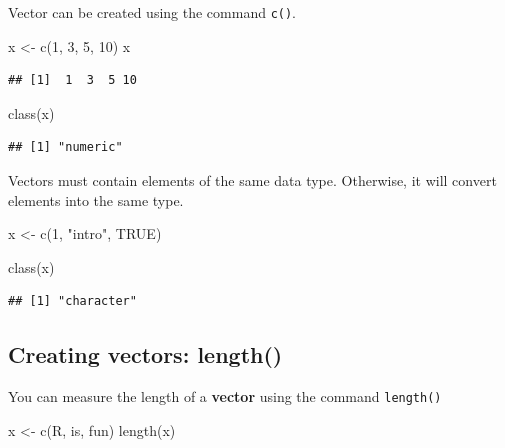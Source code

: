 \documentclass[
  11pt,
]{book}
\newenvironment{Shaded}{\begin{snugshade}}{\end{snugshade}}
\newcommand{\ConstantTok}[1]{\textcolor[rgb]{0.00,0.00,0.00}{#1}}
\newcommand{\DecValTok}[1]{\textcolor[rgb]{0.00,0.00,0.81}{#1}}
\newcommand{\FunctionTok}[1]{\textcolor[rgb]{0.00,0.00,0.00}{#1}}
\newcommand{\NormalTok}[1]{#1}
\newcommand{\OtherTok}[1]{\textcolor[rgb]{0.56,0.35,0.01}{#1}}
\newcommand{\StringTok}[1]{\textcolor[rgb]{0.31,0.60,0.02}{#1}}
\begin{document}
Vector can be created using the command \texttt{c()}.

\begin{Shaded}
\begin{Highlighting}[]
\NormalTok{x }\OtherTok{\textless{}{-}} \FunctionTok{c}\NormalTok{(}\DecValTok{1}\NormalTok{, }\DecValTok{3}\NormalTok{, }\DecValTok{5}\NormalTok{, }\DecValTok{10}\NormalTok{)}
\NormalTok{x}
\end{Highlighting}
\end{Shaded}

\begin{verbatim}
## [1]  1  3  5 10
\end{verbatim}

\begin{Shaded}
\begin{Highlighting}[]
\FunctionTok{class}\NormalTok{(x)}
\end{Highlighting}
\end{Shaded}

\begin{verbatim}
## [1] "numeric"
\end{verbatim}

Vectors must contain elements of the same data type. Otherwise, it will convert elements into the same type.

\begin{Shaded}
\begin{Highlighting}[]
\NormalTok{x }\OtherTok{\textless{}{-}} \FunctionTok{c}\NormalTok{(}\DecValTok{1}\NormalTok{, }\StringTok{"intro"}\NormalTok{, }\ConstantTok{TRUE}\NormalTok{)}

\FunctionTok{class}\NormalTok{(x)}
\end{Highlighting}
\end{Shaded}

\begin{verbatim}
## [1] "character"
\end{verbatim}

\hypertarget{creating-vectors-length}{%
\subsection{Creating vectors: length()}\label{creating-vectors-length}}

You can measure the length of a \textbf{vector} using the command \texttt{length()}

\begin{Shaded}
\begin{Highlighting}[]
\NormalTok{x }\OtherTok{\textless{}{-}} \FunctionTok{c}\NormalTok{(}\StringTok{\textquotesingle{}R\textquotesingle{}}\NormalTok{,}\StringTok{\textquotesingle{} is\textquotesingle{}}\NormalTok{, }\StringTok{\textquotesingle{} fun\textquotesingle{}}\NormalTok{)}
\FunctionTok{length}\NormalTok{(x)}
\end{Highlighting}
\end{Shaded}
\end{document}
